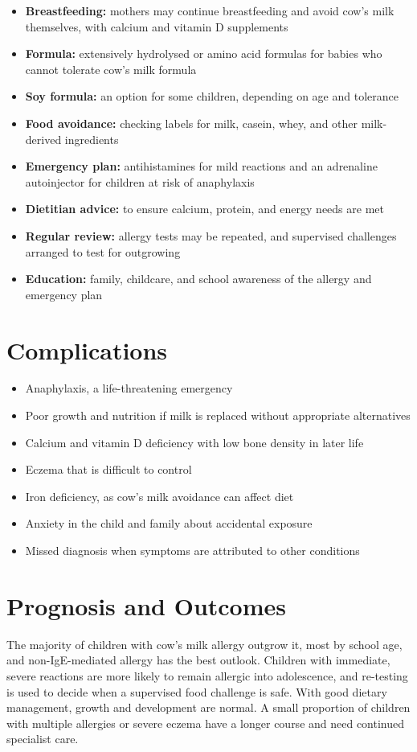 \begin{itemize}
    \item \textbf{Breastfeeding:} mothers may continue breastfeeding and avoid cow's milk themselves, with calcium and vitamin D supplements
    \item \textbf{Formula:} extensively hydrolysed or amino acid formulas for babies who cannot tolerate cow's milk formula
    \item \textbf{Soy formula:} an option for some children, depending on age and tolerance
    \item \textbf{Food avoidance:} checking labels for milk, casein, whey, and other milk-derived ingredients
    \item \textbf{Emergency plan:} antihistamines for mild reactions and an adrenaline autoinjector for children at risk of anaphylaxis
    \item \textbf{Dietitian advice:} to ensure calcium, protein, and energy needs are met
    \item \textbf{Regular review:} allergy tests may be repeated, and supervised challenges arranged to test for outgrowing
    \item \textbf{Education:} family, childcare, and school awareness of the allergy and emergency plan
\end{itemize}

\section*{Complications}
\begin{itemize}
    \item Anaphylaxis, a life-threatening emergency
    \item Poor growth and nutrition if milk is replaced without appropriate alternatives
    \item Calcium and vitamin D deficiency with low bone density in later life
    \item Eczema that is difficult to control
    \item Iron deficiency, as cow's milk avoidance can affect diet
    \item Anxiety in the child and family about accidental exposure
    \item Missed diagnosis when symptoms are attributed to other conditions
\end{itemize}

\section*{Prognosis and Outcomes}
The majority of children with cow's milk allergy outgrow it, most by school age, and non-IgE-mediated allergy has the best outlook. Children with immediate, severe reactions are more likely to remain allergic into adolescence, and re-testing is used to decide when a supervised food challenge is safe. With good dietary management, growth and development are normal. A small proportion of children with multiple allergies or severe eczema have a longer course and need continued specialist care.

